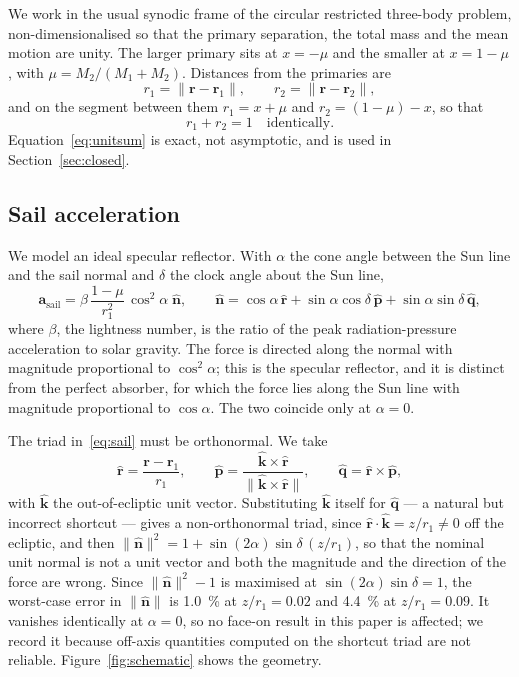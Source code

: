 \documentclass[pdflatex,sn-mathphys-num]{sn-jnl}
\newcommand{\rhat}{\hat{\bm{r}}}
\newcommand{\phat}{\hat{\bm{p}}}
\newcommand{\qhat}{\hat{\bm{q}}}
\newcommand{\nhat}{\hat{\bm{n}}}
\begin{document}
We work in the usual synodic frame of the circular restricted three-body
problem, non-dimensionalised so that the primary separation, the total mass and
the mean motion are unity. The larger primary sits at $x=-\mu$ and the smaller
at $x=1-\mu$, with $\mu=M_2/(M_1+M_2)$. Distances from the primaries are
\begin{equation}
  r_1 = \lVert\bm{r}-\bm{r}_1\rVert, \qquad
  r_2 = \lVert\bm{r}-\bm{r}_2\rVert ,
\end{equation}
and on the segment between them $r_1=x+\mu$ and $r_2=(1-\mu)-x$, so that
\begin{equation}
  r_1 + r_2 = 1 \quad\text{identically.}
  \label{eq:unitsum}
\end{equation}
Equation~\eqref{eq:unitsum} is exact, not asymptotic, and is used in
Section~\ref{sec:closed}.

\subsection{Sail acceleration}

We model an ideal specular reflector. With $\alpha$ the cone angle between the
Sun line and the sail normal and $\delta$ the clock angle about the Sun line,
\begin{equation}
  \bm{a}_{\mathrm{sail}}
  = \beta\,\frac{1-\mu}{r_1^{2}}\,\cos^{2}\!\alpha\;\nhat ,
  \qquad
  \nhat = \cos\alpha\,\rhat + \sin\alpha\cos\delta\,\phat
        + \sin\alpha\sin\delta\,\qhat ,
  \label{eq:sail}
\end{equation}
where $\beta$, the lightness number, is the ratio of the peak radiation-pressure
acceleration to solar gravity. The force is directed along the normal with
magnitude proportional to $\cos^{2}\alpha$; this is the specular reflector, and
it is distinct from the perfect absorber, for which the force lies along the Sun
line with magnitude proportional to $\cos\alpha$. The two coincide only at
$\alpha=0$.

The triad in~\eqref{eq:sail} must be orthonormal. We take
\begin{equation}
  \rhat = \frac{\bm{r}-\bm{r}_1}{r_1},\qquad
  \phat = \frac{\hat{\bm{k}}\times\rhat}{\lVert\hat{\bm{k}}\times\rhat\rVert},
  \qquad
  \qhat = \rhat\times\phat ,
  \label{eq:triad}
\end{equation}
with $\hat{\bm{k}}$ the out-of-ecliptic unit vector. Substituting
$\hat{\bm{k}}$ itself for $\qhat$ --- a natural but incorrect shortcut --- gives
a non-orthonormal triad, since $\rhat\cdot\hat{\bm{k}}=z/r_1\neq0$ off the
ecliptic, and then
$\lVert\nhat\rVert^{2}=1+\sin(2\alpha)\sin\delta\,(z/r_1)$, so that the nominal
unit normal is not a unit vector and both the magnitude and the direction of the
force are wrong. Since $\lVert\nhat\rVert^2-1$ is maximised at
$\sin(2\alpha)\sin\delta=1$, the worst-case error in $\lVert\nhat\rVert$ is
\SI{1.0}{\percent} at $z/r_1=0.02$ and \SI{4.4}{\percent} at $z/r_1=0.09$. It vanishes identically at $\alpha=0$, so no
face-on result in this paper is affected; we record it because off-axis
quantities computed on the shortcut triad are not reliable.
Figure~\ref{fig:schematic} shows the geometry.
\end{document}
